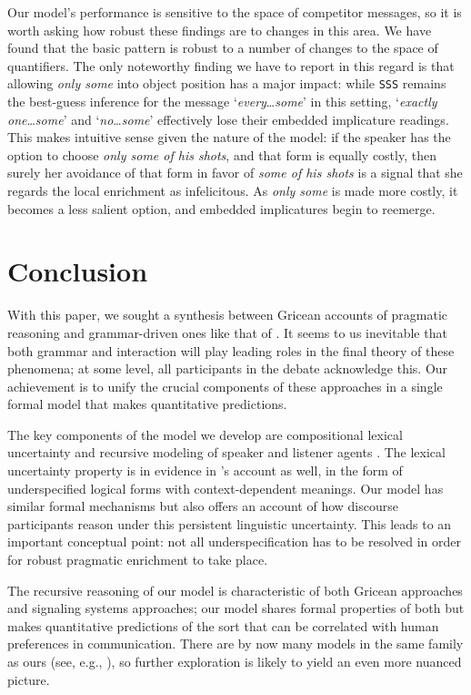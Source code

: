 \documentclass[leqno,12pt]{article}
\newcommand{\word}[1]{\emph{#1}}
\newcommand{\world}[1]{\texttt{#1}}
\newcommand{\target}[2]{`\word{#1}\ldots\word{#2}'}
\begin{document}
{Our model's performance is sensitive to the space of competitor
messages, so it is worth asking how robust these findings are to
changes in this area. We have found that the basic pattern is robust
to a number of changes to the space of quantifiers.  The only
noteworthy finding we have to report in this regard is that allowing
\word{only some} into object position has a major impact: while
\world{SSS} remains the best-guess inference for the message
\target{every}{some} in this setting, \target{exactly one}{some} and
\target{no}{some} effectively lose their embedded implicature
readings.  This makes intuitive sense given the nature of the model:
if the speaker has the option to choose \word{only some of his shots},
and that form is equally costly, then surely her avoidance of that
form in favor of \word{some of his shots} is a signal that she regards
the local enrichment as infelicitous. As \word{only some} is made more
costly, it becomes a less salient option, and embedded implicatures
begin to reemerge.



\section{Conclusion}\label{sec:conclusion}

With this paper, we sought a synthesis between Gricean accounts of
pragmatic reasoning and grammar-driven ones like that of
\citet{ChierchiaFoxSpector08}. It seems to us inevitable that both
grammar and interaction will play leading roles in the final theory of
these phenomena; at some level, all participants in the debate
acknowledge this. Our achievement is to unify the crucial components
of these approaches in a single formal model that makes quantitative
predictions.

The key components of the model we develop are compositional lexical
uncertainty and recursive modeling of speaker and listener agents
\citep{Bergen:Levy:Goodman:2014}. The lexical uncertainty property is
in evidence in \citeauthor{ChierchiaFoxSpector08}'s account as well,
in the form of underspecified logical forms with context-dependent
meanings. Our model has similar formal mechanisms but also offers an
account of how discourse participants reason under this persistent
linguistic uncertainty. This leads to an important conceptual point:
not all underspecification has to be resolved in order for robust
pragmatic enrichment to take place.

The recursive reasoning of our model is characteristic of both Gricean
approaches and signaling systems approaches; our model shares formal
properties of both but makes quantitative predictions of the sort that
can be correlated with human preferences in communication. There are
by now many models in the same family as ours (see, e.g.,
\citealt{CamererHo:2004,Jaeger:2011,Smith:Goodman:Frank:2013,Kao-etal:2014,Jaeger:Franke:2014}),
so further exploration is likely to yield an even more nuanced
picture.

}
\end{document}
